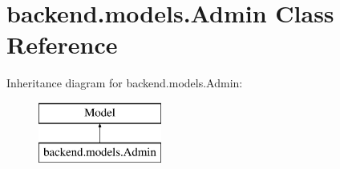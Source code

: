 \hypertarget{classbackend_1_1models_1_1_admin}{}\section{backend.\+models.\+Admin Class Reference}
\label{classbackend_1_1models_1_1_admin}
Inheritance diagram for backend.\+models.\+Admin\+:\begin{figure}[H]
\begin{center}
\leavevmode
\includegraphics[height=2.000000cm]{classbackend_1_1models_1_1_admin}
\end{center}
\end{figure}
